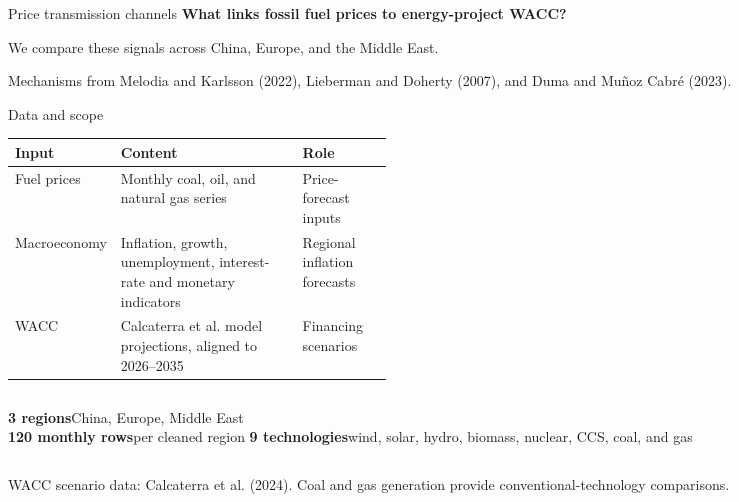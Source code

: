 \documentclass[11pt,aspectratio=169,xcolor={dvipsnames}]{beamer}
\newcommand{\source}[1]{\par\vfill{\fontsize{6.3}{7.5}\selectfont\color{PaperGray}\raggedright #1\par}}
\newcommand{\lead}[1]{{\large\color{DukeNavyBlue}\bfseries #1}\par\medskip}
\begin{document}
\begin{frame}{Price transmission channels}
\lead{What links fossil fuel prices to energy-project WACC?}
\par
\medskip
\small We compare these signals across China, Europe, and the Middle East.
\source{Mechanisms from Melodia and Karlsson (2022), Lieberman and Doherty (2007), and Duma and Muñoz Cabré (2023).}
\end{frame}

\begin{frame}{Data and scope}
\begin{tabularx}{\linewidth}{@{}p{0.20\linewidth}X p{0.24\linewidth}@{}}
\toprule
\textbf{Input} & \textbf{Content} & \textbf{Role}\\
\midrule
Fuel prices & Monthly coal, oil, and natural gas series & Price-forecast inputs\\[0.2cm]
Macroeconomy & Inflation, growth, unemployment, interest-rate and monetary indicators & Regional inflation forecasts\\[0.2cm]
WACC & Calcaterra et al. model projections, aligned to 2026--2035 & Financing scenarios\\
\bottomrule
\end{tabularx}
\vspace{0.25cm}
\begin{columns}[T,onlytextwidth]
\textbf{3 regions}\quad China, Europe, Middle East\\
\textbf{120 monthly rows}\quad per cleaned region
\textbf{9 technologies}\quad wind, solar, hydro, biomass, nuclear, CCS, coal, and gas
\end{columns}
\source{WACC scenario data: Calcaterra et al. (2024). Coal and gas generation provide conventional-technology comparisons.}
\end{frame}
\end{document}
